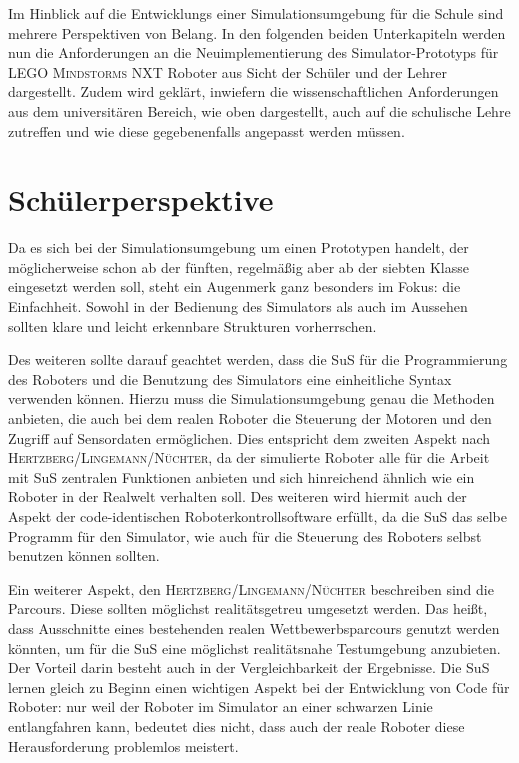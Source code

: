 \documentclass[paper=a4, DIV=14, BCOR=15mm, twoside=on, onecolumn=on, open = right, titlepage =on, parskip =half, headsepline = on, footsepline = on, chapterprefix = on, appendixprefix = off, fontsize = 12pt, numbers = noenddot, abstract = on]{scrbook}
\begin{document}
Im Hinblick auf die Entwicklungs einer Simulationsumgebung für die Schule sind mehrere Perspektiven von Belang. 
In den folgenden beiden Unterkapiteln werden nun die Anforderungen an die Neuimplementierung des Simulator-Prototyps für \textsc{LEGO Mindstorms} NXT Roboter aus Sicht der Schüler und der Lehrer dargestellt. Zudem wird geklärt, inwiefern die wissenschaftlichen Anforderungen aus dem universitären Bereich, wie oben dargestellt, auch auf die schulische Lehre zutreffen und wie diese gegebenenfalls angepasst werden müssen.

\par \singlespacing
\section{Schülerperspektive}
\label{sec:schüler}
\onehalfspacing

Da es sich bei der Simulationsumgebung um einen Prototypen handelt, der möglicherweise schon ab der fünften, regelmäßig aber ab der siebten Klasse eingesetzt werden soll, steht ein Augenmerk ganz besonders im Fokus: die Einfachheit. Sowohl in der Bedienung des Simulators als auch im Aussehen sollten klare und leicht erkennbare Strukturen vorherrschen.

Des weiteren sollte darauf geachtet werden, dass die SuS für die Programmierung des Roboters und die Benutzung des Simulators eine einheitliche Syntax verwenden können. Hierzu muss die Simulationsumgebung genau die Methoden anbieten, die auch bei dem realen Roboter die Steuerung der Motoren und den Zugriff auf Sensordaten ermöglichen. Dies entspricht dem zweiten Aspekt nach \textsc{Hertz\-berg\-/\-Lin\-ge\-mann\-/Nüch\-ter}, da der simulierte Roboter alle für die Arbeit mit SuS zentralen Funktionen anbieten und sich hinreichend ähnlich wie ein Roboter in der Realwelt verhalten soll. Des weiteren wird hiermit auch der Aspekt der code-identischen Roboterkontrollsoftware erfüllt, da die SuS das selbe Programm für den Simulator, wie auch für die Steuerung des Roboters selbst benutzen können sollten.

Ein weiterer Aspekt, den \textsc{Hertz\-berg\-/\-Lin\-ge\-mann\-/Nüch\-ter} beschreiben sind die Parcours. Diese sollten möglichst realitätsgetreu umgesetzt werden. Das heißt, dass Ausschnitte eines bestehenden realen Wettbewerbsparcours genutzt werden könnten, um für die SuS eine möglichst realitätsnahe Testumgebung anzubieten. Der Vorteil darin besteht auch in der Vergleichbarkeit der Ergebnisse. Die SuS lernen gleich zu Beginn einen wichtigen Aspekt bei der Entwicklung von Code für Roboter: nur weil der Roboter im Simulator an einer schwarzen Linie entlangfahren kann, bedeutet dies nicht, dass auch der reale Roboter diese Herausforderung problemlos meistert.
\end{document}
